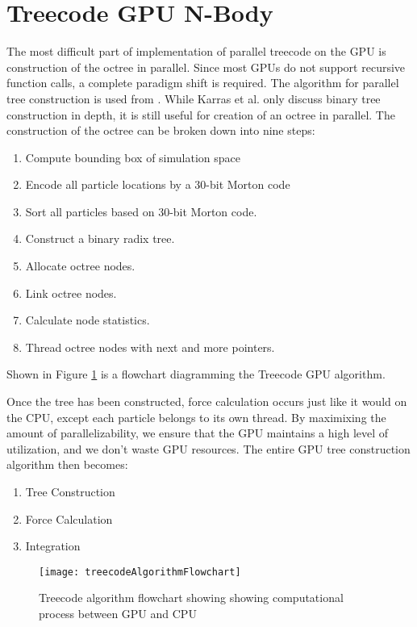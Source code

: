 \documentclass{thesis}
\begin{document}
\section{Treecode GPU N-Body}
The most difficult part of implementation of parallel treecode on the GPU is construction of the octree in parallel. Since most GPUs do not support recursive function calls, a complete paradigm shift is required. The algorithm for parallel tree construction is used from \cite{karras:2012}. While Karras et al. only discuss binary tree construction in depth, it is still useful for creation of an octree in parallel. The construction of the octree can be broken down into nine steps:
\begin{enumerate}[noitemsep]
    \item Compute bounding box of simulation space
    \item Encode all particle locations by a 30-bit Morton code
    \item Sort all particles based on 30-bit Morton code.
    \item Construct a binary radix tree.
    \item Allocate octree nodes.
    \item Link octree nodes.
    \item Calculate node statistics.
    \item Thread octree nodes with next and more pointers.
\end{enumerate}
Shown in Figure \ref{fig:GPUTreecodeAlg} is a flowchart diagramming the Treecode GPU algorithm.

Once the tree has been constructed, force calculation occurs just like it would on the CPU, except each particle belongs to its own thread. By maximixing the amount of parallelizability, we ensure that the GPU maintains a high level of utilization, and we don't waste GPU resources. The entire GPU tree construction algorithm then becomes:
\begin{enumerate}[noitemsep]
    \item Tree Construction
    \item Force Calculation
    \item Integration
\end{enumerate}
\begin{figure}[h]
    \caption{Treecode algorithm flowchart showing showing computational process between GPU and CPU}
    \label{fig:GPUTreecodeAlg}
    \centering
    \texttt{[image: treecodeAlgorithmFlowchart]}
\end{figure}
\end{document}
